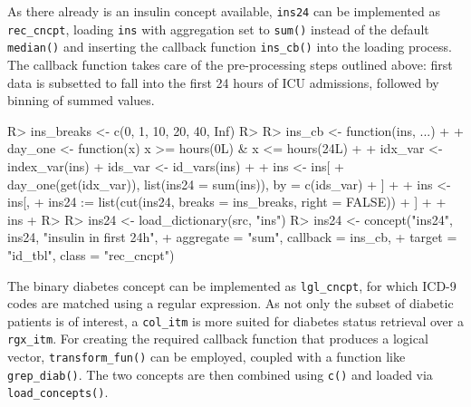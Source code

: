 \documentclass[
  notitle]{jss}
\begin{document}
As there already is an insulin concept available, \texttt{ins24} can be
implemented as \texttt{rec\_cncpt}, loading \texttt{ins} with
aggregation set to \texttt{sum()} instead of the default
\texttt{median()} and inserting the callback function \texttt{ins\_cb()}
into the loading process. The callback function takes care of the
pre-processing steps outlined above: first data is subsetted to fall
into the first 24 hours of ICU admissions, followed by binning of summed
values.

\begin{CodeChunk}
\begin{CodeInput}
R> ins_breaks <- c(0, 1, 10, 20, 40, Inf)
R> 
R> ins_cb <- function(ins, ...) {
+ 
+   day_one <- function(x) x >= hours(0L) & x <= hours(24L)
+ 
+   idx_var <- index_var(ins)
+   ids_var <- id_vars(ins)
+ 
+   ins <- ins[
+     day_one(get(idx_var)), list(ins24 = sum(ins)), by = c(ids_var)
+   ]
+ 
+   ins <- ins[,
+     ins24 := list(cut(ins24, breaks = ins_breaks, right = FALSE))
+   ]
+ 
+   ins
+ }
R> 
R> ins24 <- load_dictionary(src, "ins")
R> ins24 <- concept("ins24", ins24, "insulin in first 24h",
+                  aggregate = "sum", callback = ins_cb,
+                  target = "id_tbl", class = "rec_cncpt")
\end{CodeInput}
\end{CodeChunk}

The binary diabetes concept can be implemented as \texttt{lgl\_cncpt},
for which ICD-9 codes are matched using a regular expression. As not
only the subset of diabetic patients is of interest, a \texttt{col\_itm}
is more suited for diabetes status retrieval over a \texttt{rgx\_itm}.
For creating the required callback function that produces a logical
vector, \texttt{transform\_fun()} can be employed, coupled with a
function like \texttt{grep\_diab()}. The two concepts are then combined
using \texttt{c()} and loaded via \texttt{load\_concepts()}.

\begin{CodeChunk}
\begin{CodeInput}
R> grep_diab <- function(x) grepl("^250\\.?[0-9]{2}$", x)
R> 
R> diab  <- item(src, table = "diagnoses_icd",
+               callback = transform_fun(grep_diab), class = "col_itm")
R> diab  <- concept("diab", diab, "diabetes", target = "id_tbl",
+                  class = "lgl_cncpt")
R> 
R> dat <- load_concepts(c(ins24, diab), id_type = "icustay",
+                      verbose = FALSE)
R> dat <- replace_na(dat, "[0,1)", vars = "ins24")
R> 
R> dat
\end{CodeInput}
\end{CodeChunk}
\end{document}

